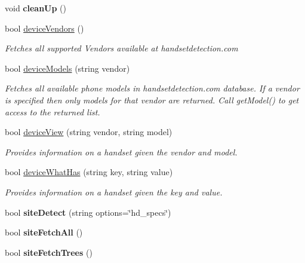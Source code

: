 \begin{DoxyCompactItemize}
\item 
\hypertarget{class_h_d3_1_1_h_d3_a0431d69035a8245a195f9060d5525790}{void {\bfseries clean\+Up} ()}\label{class_h_d3_1_1_h_d3_a0431d69035a8245a195f9060d5525790}

\item 
bool \hyperlink{class_h_d3_1_1_h_d3_aa2f63450321e2f47b2cb3baf8ff1a5e8}{device\+Vendors} ()
\begin{DoxyCompactList}\small\item\em Fetches all supported Vendors available at handsetdetection.\+com\end{DoxyCompactList}\item 
bool \hyperlink{class_h_d3_1_1_h_d3_a5af669048eb1d372a703dd53b242fe2f}{device\+Models} (string vendor)
\begin{DoxyCompactList}\small\item\em Fetches all available phone models in handsetdetection.\+com database. If a vendor is specified then only models for that vendor are returned. Call get\+Model() to get access to the returned list. \end{DoxyCompactList}\item 
bool \hyperlink{class_h_d3_1_1_h_d3_aaba6d717a4579ca6fa7c5727e5d92333}{device\+View} (string vendor, string model)
\begin{DoxyCompactList}\small\item\em Provides information on a handset given the vendor and model. \end{DoxyCompactList}\item 
bool \hyperlink{class_h_d3_1_1_h_d3_a9640edbaf4dd41cd1c8bec9fa86f53a6}{device\+What\+Has} (string key, string value)
\begin{DoxyCompactList}\small\item\em Provides information on a handset given the key and value. \end{DoxyCompactList}\item 
\hypertarget{class_h_d3_1_1_h_d3_a094f2de65aed6b70560ae08c8fabfb2b}{bool {\bfseries site\+Detect} (string options=\char`\"{}hd\+\_\+specs\char`\"{})}\label{class_h_d3_1_1_h_d3_a094f2de65aed6b70560ae08c8fabfb2b}

\item 
\hypertarget{class_h_d3_1_1_h_d3_ad40ca41ce8ab43e23d9fec5d69eb59b5}{bool {\bfseries site\+Fetch\+All} ()}\label{class_h_d3_1_1_h_d3_ad40ca41ce8ab43e23d9fec5d69eb59b5}

\item 
\hypertarget{class_h_d3_1_1_h_d3_ab7987ac1e6295533e55dcd5d300ae9cc}{bool {\bfseries site\+Fetch\+Trees} ()}\label{class_h_d3_1_1_h_d3_ab7987ac1e6295533e55dcd5d300ae9cc}


\end{DoxyCompactItemize}
